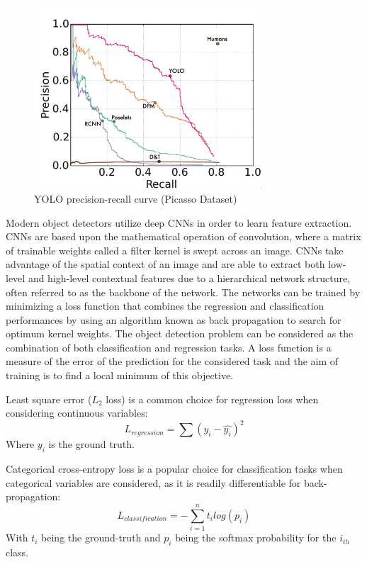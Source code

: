 \documentclass[a4paper,twoside,12pt]{report}
\begin{document}
\begin{figure}[h!]
\begin{center}
\includegraphics[width=8.5cm]{images/yoloplot.jpg}
\caption{YOLO precision-recall curve (Picasso Dataset) \citep{yolo}}
\label{fig:yoloplot}
\end{center}
\end{figure}

Modern object detectors utilize deep CNNs in order to learn feature extraction. CNNs are based upon the mathematical operation of convolution, where a matrix of trainable weights called a filter kernel is swept across an image. CNNs take advantage of the spatial context of an image and are able to extract both low-level and high-level contextual features due to a hierarchical network structure, often referred to as the backbone of the network. The networks can be trained by minimizing a loss function that combines the regression and classification performances by using an algorithm known as back propagation to search for optimum kernel weights. The object detection problem can be considered as the combination of both classification and regression tasks. A loss function is a measure of the error of the prediction for the considered task and the aim of training is to find a local minimum of this objective.

Least square error ($L_2$ loss) is a common choice for regression loss when considering continuous variables:
\begin{equation}
L_{regression} = \sum(y_i-\hat{y_i})^2 
\end{equation} 
Where $y_i$ is the ground truth.

Categorical cross-entropy loss is a popular choice for classification tasks when categorical variables are considered, as it is readily differentiable for back-propagation:
\begin{equation}
L_{classification} = -\sum_{i=1}^{n}t_i log(p_i)
\end{equation} 
With $t_i$ being the ground-truth and $p_i$ being the softmax probability for the $i_{th}$ class.
\end{document}
